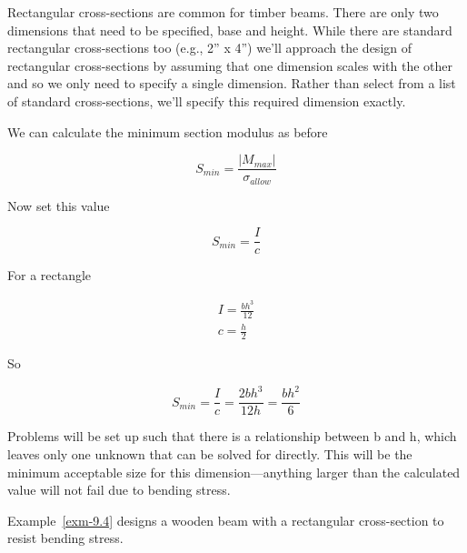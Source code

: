 \documentclass[
  letterpaper,
  DIV=11,
  numbers=noendperiod]{scrreprt}
\theoremstyle{definition}
\theoremstyle{remark}
\begin{document}
Rectangular cross-sections are common for timber beams. There are only
two dimensions that need to be specified, base and height. While there
are standard rectangular cross-sections too (e.g., 2'' x 4'') we'll
approach the design of rectangular cross-sections by assuming that one
dimension scales with the other and so we only need to specify a single
dimension. Rather than select from a list of standard cross-sections,
we'll specify this required dimension exactly.

We can calculate the minimum section modulus as before

\[
S_{min}=\frac{\left|M_{max}\right|}{\sigma_{allow}}
\]

Now set this value

\[
S_{min}=\frac{I}{c}
\]

For a rectangle

\[
\begin{gathered}
I=\frac{b h^3}{12} \\
c=\frac{h}{2}
\end{gathered}
\]

So

\[
S_{min}=\frac{I}{c}=\frac{2 b h^3}{12 h}=\frac{b h^2}{6}
\]

Problems will be set up such that there is a relationship between b and
h, which leaves only one unknown that can be solved for directly. This
will be the minimum acceptable size for this dimension---anything larger
than the calculated value will not fail due to bending stress.

Example~\ref{exm-9.4} designs a wooden beam with a rectangular
cross-section to resist bending stress.
\end{document}
